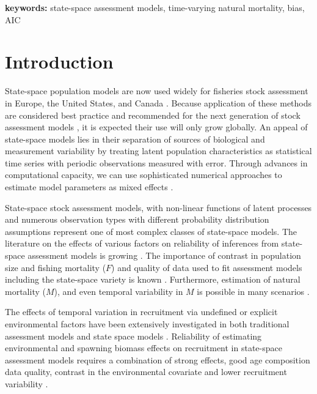 \documentclass[
  12pt,
]{article}
\begin{document}
\textbf{keywords:} state-space assessment models, time-varying natural mortality, bias, AIC

\pagebreak

\hypertarget{introduction}{%
\section*{Introduction}\label{introduction}}

State-space population models are now used widely for fisheries stock assessment in Europe, the United States, and Canada \citep{nielsenberg14, cadigan16, pedersenberg17, stockmiller21}. Because application of these methods are considered best practice and recommended for the next generation of stock assessment models \citep{hoyleetal22, punt23}, it is expected their use will only grow globally. An appeal of state-space models lies in their separation of sources of biological and measurement variability by treating latent population characteristics as statistical time series with periodic observations measured with error. Through advances in computational capacity, we can use sophisticated numerical approaches to estimate model parameters as mixed effects \citep{thorsonminto15, kristensenetal16}.

State-space stock assessment models, with non-linear functions of latent processes and numerous observation types with different probability distribution assumptions represent one of most complex classes of state-space models. The literature on the effects of various factors on reliability of inferences from state-space assessment models is growing \citep{lietal24, milleretal_inreview1}. The importance of contrast in population size and fishing mortality (\(F\)) and quality of data used to fit assessment models including the state-space variety is known \citep{magnussonhilborn07, milleretal_inreview1}. Furthermore, estimation of natural mortality (\(M\)), and even temporal variability in \(M\) is possible in many scenarios \citep{leeetal11, cadigan16, millerhyun18, milleretal_inreview1}.

The effects of temporal variation in recruitment via undefined or explicit environmental factors have been extensively investigated in both traditional assessment models and state space models \citep{myers98, haltuchpunt11, johnsonetal16, milleretal16}. Reliability of estimating environmental and spawning biomass effects on recruitment in state-space assessment models requires a combination of strong effects, good age composition data quality, contrast in the environmental covariate and lower recruitment variability \citep{brittenetal_inreview, milleretal_inreview1}.
\end{document}
